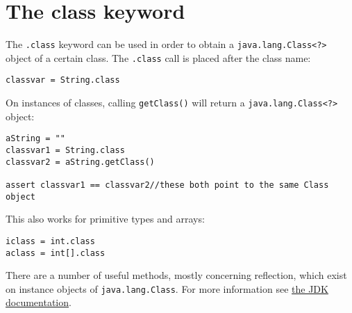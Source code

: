 \documentclass[conc-doc]{subfiles}
\begin{document}
	\chapter[The class keyword]{The class keyword}
	

The \lstinline{.class} keyword can be used in order to obtain a \lstinline{java.lang.Class<?>} object of a certain class. The \lstinline{.class} call is placed after the class name:

\begin{lstlisting}
classvar = String.class
\end{lstlisting}

On instances of classes, calling \lstinline{getClass()} will return a \lstinline{java.lang.Class<?>} object:
\begin{lstlisting}
aString = ""
classvar1 = String.class
classvar2 = aString.getClass()

assert classvar1 == classvar2//these both point to the same Class object
\end{lstlisting}

This also works for primitive types and arrays:
\begin{lstlisting}
iclass = int.class
aclass = int[].class
\end{lstlisting}

There are a number of useful methods, mostly concerning reflection, which exist on instance objects of \lstinline{java.lang.Class}. For more information see \href{https://docs.oracle.com/javase/9/docs/api/index.html?overview-summary.html}{the JDK documentation}. 
\end{document}
